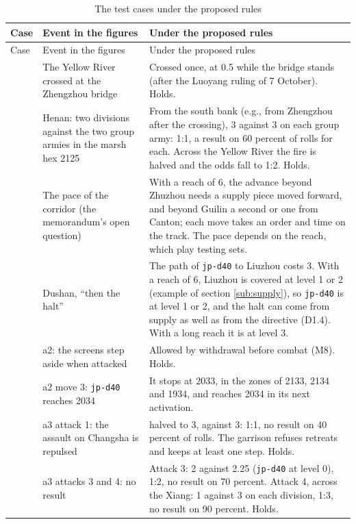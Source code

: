 \documentclass[11pt]{article}
\begin{document}
{\small
\begin{longtable}{@{}>{\raggedright\arraybackslash}p{}>{\raggedright\arraybackslash}p{}>{\raggedright\arraybackslash}p{}@{}}
\caption{The test cases under the proposed rules}\label{tab:checks}\\
\toprule
Case & Event in the figures & Under the proposed rules \\
\midrule
\endfirsthead
\toprule
Case & Event in the figures & Under the proposed rules \\
\midrule
\endhead
\bottomrule
\endfoot
1 & The Yellow River crossed at the Zhengzhou bridge & Crossed once, at 0.5 while the bridge stands (after the Luoyang ruling of 7 October). Holds. \\
1 & Henan: two divisions against the two group armies in the marsh hex 2125 & From the south bank (e.g., from Zhengzhou after the crossing), 3 against 3 on each group army: 1:1, a result on 60 percent of rolls for each. Across the Yellow River the fire is halved and the odds fall to 1:2. Holds. \\
1 & The pace of the corridor (the memorandum's open question) & With a reach of 6, the advance beyond Zhuzhou needs a supply piece moved forward, and beyond Guilin a second or one from Canton; each move takes an order and time on the track. The pace depends on the reach, which play testing sets. \\
1 & Dushan, ``then the halt'' & The path of \texttt{jp-d40} to Liuzhou costs 3. With a reach of 6, Liuzhou is covered at level 1 or 2 (example of section \ref{sub:supply}), so \texttt{jp-d40} is at level 1 or 2, and the halt can come from supply as well as from the directive (D1.4). With a long reach it is at level 3. \\
2 & a2: the screens step aside when attacked & Allowed by withdrawal before combat (M8). Holds. \\
2 & a2 move 3: \texttt{jp-d40} reaches 2034 & It stops at 2033, in the zones of 2133, 2134 and 1934, and reaches 2034 in its next activation. \\
2 & a3 attack 1: the assault on Changsha is repulsed & 6 halved to 3, against 3: 1:1, no result on 40 percent of rolls. The garrison refuses retreats and keeps at least one step. Holds. \\
2 & a3 attacks 3 and 4: no result & Attack 3: 2 against 2.25 (\texttt{jp-d40} at level 0), 1:2, no result on 70 percent. Attack 4, across the Xiang: 1 against 3 on each division, 1:3, no result on 90 percent. Holds. \\

\end{longtable}}
\end{document}
